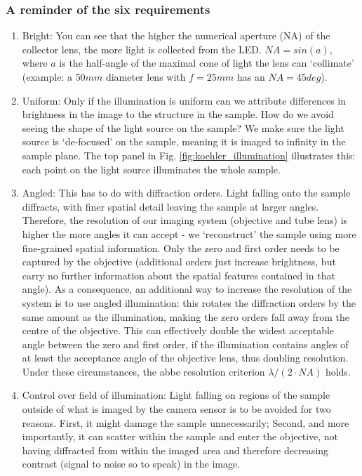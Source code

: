 \documentclass[a4paper]{report}
\begin{document}
\subsubsection{A reminder of the six requirements}
\begin{enumerate}
    \item Bright: You can see that the higher the numerical aperture (NA) of the collector lens, the more light is collected from the LED. $NA=sin(a)$, where $a$ is the half-angle of the maximal cone of light the lens can `collimate' (example: a $50mm$ diameter lens with $f=25mm$ has an $NA=45deg$).
    \item Uniform: Only if the illumination is uniform can we attribute differences in brightness in the image to the structure in the sample. How do we avoid seeing the shape of the light source on the sample? We make sure the light source is `de-focused' on the sample, meaning it is imaged to infinity in the sample plane. The top panel in Fig. \ref{fig:koehler_illumination} illustrates this: each point on the light source illuminates the whole sample.
    \item Angled: This has to do with diffraction orders. Light falling onto the sample diffracts, with finer spatial detail leaving the sample at larger angles. Therefore, the resolution of our imaging system (objective and tube lens) is higher the more angles it can accept - we `reconstruct' the sample using more fine-grained spatial information. Only the zero and first order needs to be captured by the objective (additional orders just increase brightness, but carry no further information about the spatial features contained in that angle). As a consequence, an additional way to increase the resolution of the system is to use angled illumination: this rotates the diffraction orders by the same amount as the illumination, making the zero orders fall away from the centre of the objective. This can effectively double the widest acceptable angle between the zero and first order, if the illumination contains angles of at least the acceptance angle of the objective lens, thus doubling resolution. Under these circumstances, the abbe resolution criterion $\lambda / (2\cdot NA)$ holds.
    \item Control over field of illumination: Light falling on regions of the sample outside of what is imaged by the camera sensor is to be avoided for two reasons. First, it might damage the sample unnecessarily; Second, and more importantly, it can scatter within the sample and enter the objective, not having diffracted from within the imaged area and therefore decreasing contrast (signal to noise so to speak) in the image.

\end{enumerate}
\end{document}
